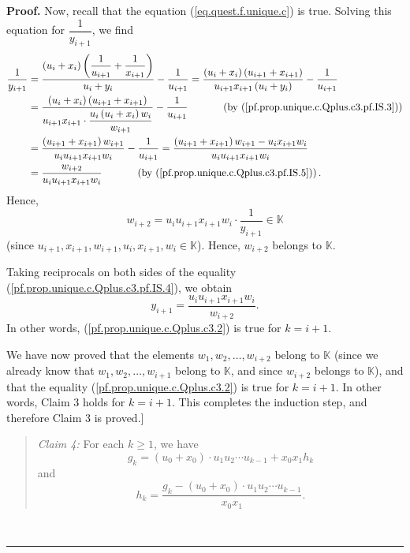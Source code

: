 \documentclass[numbers=enddot,12pt,final,onecolumn,notitlepage]{scrartcl}%
\theoremstyle{definition}
\newenvironment{statement}{\begin{quote}}{\end{quote}}
\newenvironment{proof}[1][Proof]{\noindent\textbf{#1.} }{\ \rule{0.5em}{0.5em}}
\newenvironment{verlong}{}{}
\begin{document}
\begin{verlong}
\begin{proof}
Now, recall that the equation (\ref{eq.quest.f.unique.c}) is true. Solving
this equation for $\dfrac{1}{y_{i+1}}$, we find%
\begin{align}
\dfrac{1}{y_{i+1}}  &  =\dfrac{\left(  u_{i}+x_{i}\right)  \left(  \dfrac
{1}{u_{i+1}}+\dfrac{1}{x_{i+1}}\right)  }{u_{i}+y_{i}}-\dfrac{1}{u_{i+1}%
}=\dfrac{\left(  u_{i}+x_{i}\right)  \left(  u_{i+1}+x_{i+1}\right)  }%
{u_{i+1}x_{i+1}\left(  u_{i}+y_{i}\right)  }-\dfrac{1}{u_{i+1}}\nonumber\\
&  =\dfrac{\left(  u_{i}+x_{i}\right)  \left(  u_{i+1}+x_{i+1}\right)
}{u_{i+1}x_{i+1}\cdot\dfrac{u_{i}\left(  u_{i}+x_{i}\right)  w_{i}}{w_{i+1}}%
}-\dfrac{1}{u_{i+1}}\ \ \ \ \ \ \ \ \ \ \left(  \text{by
(\ref{pf.prop.unique.c.Qplus.c3.pf.IS.3})}\right) \nonumber\\
&  =\dfrac{\left(  u_{i+1}+x_{i+1}\right)  w_{i+1}}{u_{i}u_{i+1}x_{i+1}w_{i}%
}-\dfrac{1}{u_{i+1}}=\dfrac{\left(  u_{i+1}+x_{i+1}\right)  w_{i+1}%
-u_{i}x_{i+1}w_{i}}{u_{i}u_{i+1}x_{i+1}w_{i}}\nonumber\\
&  =\dfrac{w_{i+2}}{u_{i}u_{i+1}x_{i+1}w_{i}}\ \ \ \ \ \ \ \ \ \ \left(
\text{by (\ref{pf.prop.unique.c.Qplus.c3.pf.IS.5})}\right)  .
\label{pf.prop.unique.c.Qplus.c3.pf.IS.4}%
\end{align}
Hence,%
\begin{equation}
w_{i+2}=u_{i}u_{i+1}x_{i+1}w_{i}\cdot\dfrac{1}{y_{i+1}}\in\mathbb{K}\nonumber
\end{equation}
(since $u_{i+1},x_{i+1},w_{i+1},u_{i},x_{i+1},w_{i}\in\mathbb{K}$). Hence,
$w_{i+2}$ belongs to $\mathbb{K}$.

Taking reciprocals on both sides of the equality
(\ref{pf.prop.unique.c.Qplus.c3.pf.IS.4}), we obtain%
\[
y_{i+1}=\dfrac{u_{i}u_{i+1}x_{i+1}w_{i}}{w_{i+2}}.
\]
In other words, (\ref{pf.prop.unique.c.Qplus.c3.2}) is true for $k=i+1$.

We have now proved that the elements $w_{1},w_{2},\ldots,w_{i+2}$ belong to
$\mathbb{K}$ (since we already know that $w_{1},w_{2},\ldots,w_{i+1}$ belong
to $\mathbb{K}$, and since $w_{i+2}$ belongs to $\mathbb{K}$), and that the
equality (\ref{pf.prop.unique.c.Qplus.c3.2}) is true for $k=i+1$. In other
words, Claim 3 holds for $k=i+1$. This completes the induction step, and
therefore Claim 3 is proved.]

\begin{statement}
\textit{Claim 4:} For each $k\geq1$, we have
\begin{equation}
g_{k}=\left(  u_{0}+x_{0}\right)  \cdot u_{1}u_{2}\cdots u_{k-1}+x_{0}%
x_{1}h_{k} \label{pf.prop.unique.c.Qplus.c4.1}%
\end{equation}
and%
\begin{equation}
h_{k}=\dfrac{g_{k}-\left(  u_{0}+x_{0}\right)  \cdot u_{1}u_{2}\cdots u_{k-1}%
}{x_{0}x_{1}}. \label{pf.prop.unique.c.Qplus.c4.2}%
\end{equation}


\end{statement}
\end{proof}
\end{verlong}
\end{document}
